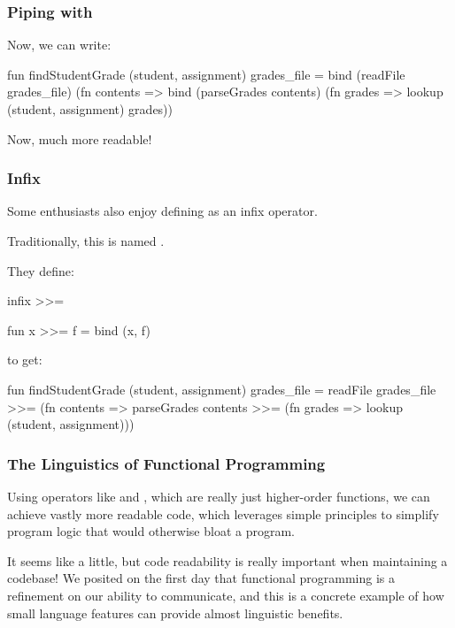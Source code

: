 \documentclass[aspectratio=169]{beamer}
\begin{document}
\begin{frame}[fragile]
  \frametitle{Piping with }

  Now, we can write:

  \pause
  \begin{codeblock}
    fun findStudentGrade (student, assignment) grades_file =
      bind (readFile grades_file) (fn contents =>
      bind (parseGrades contents) (fn grades =>
      lookup (student, assignment) grades))
  \end{codeblock}

  \pause
  \vspace{\fill}

  Now, much more readable!
\end{frame}

\begin{frame}[fragile]
  \frametitle{Infix }

  Some enthusiasts also enjoy defining  as an infix operator.

  \pause
  \vspace{\fill}
  
  Traditionally, this is named \code{>>=}.\footnotemark

  \pause
  \vspace{\fill}

  They define: 
  \begin{codeblock}
    infix >>=

    fun x >>= f = bind (x, f)
  \end{codeblock}

  \pause
  \vspace{\fill}

  to get:
  \begin{codeblock}
    fun findStudentGrade (student, assignment) grades_file =
      readFile grades_file >>= (fn contents =>
      parseGrades contents >>= (fn grades =>
      lookup (student, assignment)))
  \end{codeblock}

\end{frame}

\begin{frame}[fragile]
  \frametitle{The Linguistics of Functional Programming}

  Using operators like \code{>>=} and \code{|>}, which are really just
  higher-order functions, we can achieve vastly more readable code, which
  leverages simple principles to simplify program logic that would 
  otherwise bloat a program.

  \pause
  \vspace{\fill}

  It seems like a little, but code readability is really important when 
  maintaining a codebase! We posited on the first day that functional 
  programming is a refinement on our ability to communicate, and this is 
  a concrete example of how small language features can provide almost 
  linguistic benefits.
\end{frame}
\end{document}
